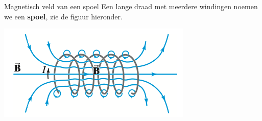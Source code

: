 \begin{theo}{Magnetisch veld van een spoel}
    Een lange draad met meerdere windingen noemen we een \textbf{spoel}, zie de figuur hieronder.


        \begin{center}
            \includegraphics[scale = 0.45]{Images/Magnetisme/Spoel}
        \end{center}



\end{theo}

